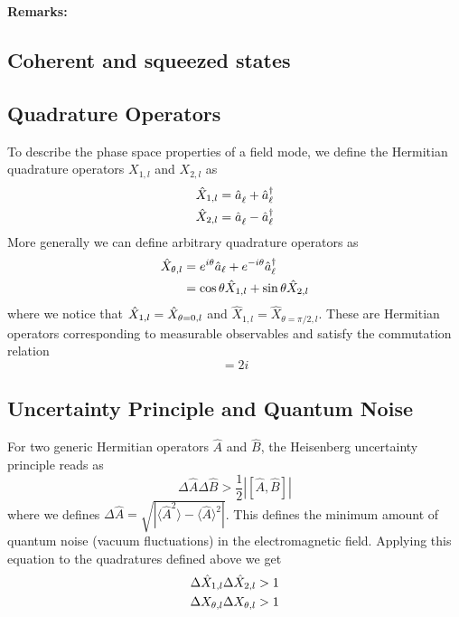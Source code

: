 \noindent\textbf{Remarks:}



\color{red} \subsection*{Coherent and squeezed states }



\color{black}
\subsection*{Quadrature Operators}

To describe the phase space properties of a field mode, we define the Hermitian quadrature operators $X_{1,l}$ and $X_{2,l}$ as
\begin{equation}
  \begin{split}
    \hat{X}_{1,l} &= \hat{a}^{\vphantom{\dagger}}_{\ell} + \hat{a}_{\ell}^\dagger  \\
    \hat{X}_{2,l} &= \hat{a}^{\vphantom{\dagger}}_{\ell} - \hat{a}_{\ell}^\dagger
  \end{split}
\end{equation}
More generally we can define arbitrary quadrature operators as 
\begin{align}
  \hat{X}_{\theta,l} &= e^{i\theta}\hat{a}_{\ell}+ e^{-i\theta}\hat{a}_{\ell}^{\dagger} \notag \\ 
  & = \cos \theta \hat{X}_{1,l} + \sin \theta \hat{X}_{2,l}
\end{align}
where we notice that $\hat{X}_{1,l} = \hat{X}_{\theta=0\vphantom{\pi/2},l}$ and $\hat{X}_{1,l} = \hat{X}_{\theta=\pi/2,l}$. These are Hermitian operators corresponding to measurable observables and satisfy the commutation relation
\begin{equation}
[X_{\theta \vphantom{\pi/2},l}, X_{\theta+\pi/2,l}] = 2i
\end{equation}

\subsection*{Uncertainty Principle and Quantum Noise}

For two generic Hermitian operators $\hat{A}$ and $\hat{B}$, the Heisenberg uncertainty principle reads as 
\begin{equation}
  \Delta \hat{A}\Delta \hat{B} > \frac{1}{2} |[\hat{A}, \hat{B}]|
\end{equation}
where we defines $\Delta \hat{A}=\sqrt{|\langle \hat{A}^2\rangle - \langle \hat{A} \rangle^2|}$. This defines the minimum amount of quantum noise (vacuum fluctuations) in the electromagnetic field.
Applying this equation to the quadratures defined above we get 
\begin{equation}
   \begin{split}
    \Delta \hat{X}_{1,l} \Delta \hat{X}_{2,l} &> 1 \\
    \Delta X_{\theta \vphantom{\pi/2},l} \Delta X_{\theta \vphantom{\pi/2},l} &> 1
   \end{split}
\end{equation}
